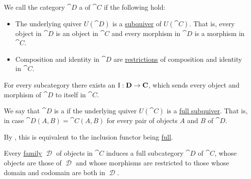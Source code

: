 \begin{definition}\label{def:subcategory}
  We call the category \( \cat{D} \) a  of \( \cat{C} \) if the following hold:
  \begin{itemize}
    \item The underlying quiver \( U(\cat{D}) \) is a \hyperref[def:quiver/submodel]{subquiver} of \( U(\cat{C}) \). That is, every object in \( \cat{D} \) is an object in \( \cat{C} \) and every morphism in \( \cat{D} \) is a morphism in \( \cat{C} \).
    \item Composition and identity in \( \cat{D} \) are \hyperref[def:multi_valued_function/restriction]{restrictions} of composition and identity in \( \cat{C} \).
  \end{itemize}

  \begin{thmenum}
     For every subcategory there exists an  \( \operatorname{I}: \operatorname{\mathbf{D}} \to \operatorname{\mathbf{C}} \), which sends every object and morphism of \( \cat{D} \) to itself in \( \cat{C} \).

     We say that \( \cat{D} \) is a  if the underlying quiver \( U(\cat{C}) \) is a \hyperref[def:quiver/submodel]{full subquiver}. That is, in case \( \cat{D}(A, B) = \cat{C}(A, B) \) for every pair of objects \( A \) and \( B \) of \( \cat{D} \).

    By , this is equivalent to the inclusion functor being \hyperref[def:functor_invertibility/full]{full}.

     Every \hyperref[rem:family_of_sets]{family} \( \mscrD \) of objects in \( \cat{C} \) induces a full subcategory \( \cat{D} \) of \( \cat{C} \), whose objects are those of \( \mscrD \) and whose morphisms are restricted to those whose domain and codomain are both in \( \mscrD \).
  \end{thmenum}
\end{definition}

